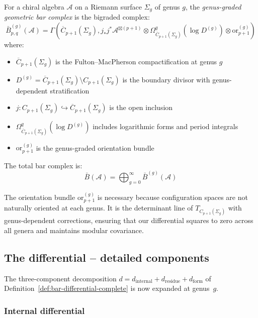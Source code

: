 \begin{definition}\label{def:geom-bar}
For a chiral algebra $\mathcal{A}$ on a Riemann surface $\Sigma_g$ of genus $g$, the \emph{genus-graded geometric bar complex} is the bigraded complex:
\[
\bar{B}^{(g)}_{p,q}(\mathcal{A}) = \Gamma\left(\overline{C}_{p+1}(\Sigma_g), j_*j^*\mathcal{A}^{\boxtimes(p+1)} \otimes \Omega^q_{\overline{C}_{p+1}(\Sigma_g)}(\log D^{(g)}) \otimes \text{or}_{p+1}^{(g)}\right)
\]
where:
\begin{itemize}
\item $\overline{C}_{p+1}(\Sigma_g)$ is the Fulton--MacPherson compactification at genus $g$
\item $D^{(g)} = \overline{C}_{p+1}(\Sigma_g) \setminus C_{p+1}(\Sigma_g)$ is the boundary divisor with genus-dependent stratification
\item $j: C_{p+1}(\Sigma_g) \hookrightarrow \overline{C}_{p+1}(\Sigma_g)$ is the open inclusion
\item $\Omega^q_{\overline{C}_{p+1}(\Sigma_g)}(\log D^{(g)})$ includes logarithmic forms and period integrals
\item $\text{or}_{p+1}^{(g)}$ is the genus-graded orientation bundle
\end{itemize}

The total bar complex is:
\[\bar{B}(\mathcal{A}) = \bigoplus_{g=0}^{\infty} \bar{B}^{(g)}(\mathcal{A})\]
\end{definition}
 
\begin{remark}
The orientation bundle $\text{or}_{p+1}^{(g)}$ is necessary because configuration spaces are not naturally 
oriented at each genus. It is the determinant line of $T_{C_{p+1}(\Sigma_g)}$ with genus-dependent corrections, ensuring that our differential squares to zero across all genera and maintains modular covariance.
\end{remark}
 
\subsection{The differential -- detailed components}

The three-component decomposition $d = d_{\text{internal}} + d_{\text{residue}} + d_{\text{form}}$
of Definition~\ref{def:bar-differential-complete} is now expanded at genus~$g$.
 
\subsubsection{Internal differential}
 
